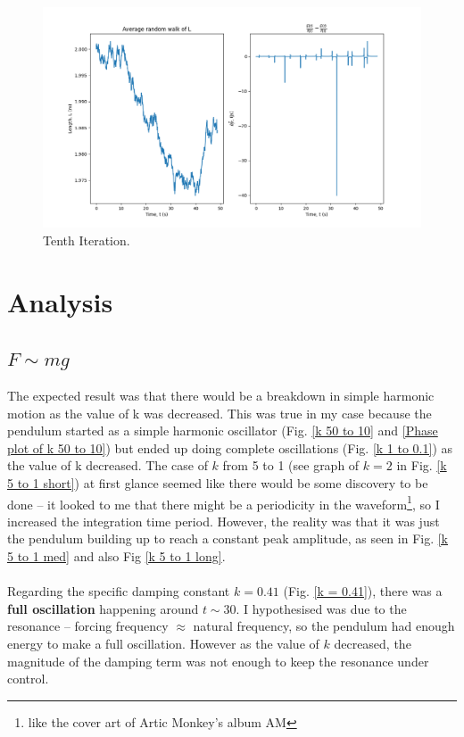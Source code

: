 \documentclass[10pt, twocolumn]{article}
\begin{document}
\begin{figure}
    \centering
    \includegraphics[width = \columnwidth]{Projects/ForcedSimplePendulum/Plots/simplified m = 1.0, L0= 2.0, k = 1000, g = 9.81, F = 20, sigma = 1e-10, run number 9.png}
    \caption{Tenth Iteration.}
    \label{fig:enter-label}
\end{figure}


\twocolumn
\section{Analysis}{\label{analysis}}
\subsection{$F \sim{mg}$}{\label{analysisFmg}}
The expected result was that there would be a breakdown in simple harmonic motion as the value of k was decreased. This was true in my case because the pendulum started as a simple harmonic oscillator (Fig. \ref{k 50 to 10} and \ref{Phase plot of k 50 to 10}) but ended up doing complete oscillations (Fig. \ref{k 1 to 0.1}) as the value of k decreased. The case of $k$ from 5 to 1 (see graph of $k = 2$ in Fig. \ref{k 5 to 1 short}) at first glance seemed like there would be some discovery to be done -- it looked to me that there might be a periodicity in the waveform\footnote{like the cover art of Artic Monkey's album AM}, so I increased the integration time period. However, the reality was that it was just the pendulum building up to reach a constant peak amplitude, as seen in Fig. \ref{k 5 to 1 med} and also Fig \ref{k 5 to 1 long}.\\
\\
Regarding the specific damping constant $k = 0.41$ (Fig. \ref{k = 0.41}), there was a \textbf{full oscillation} happening around $t \sim{30}$. I hypothesised was due to the resonance -- forcing frequency $\approx$ natural frequency, so the pendulum had enough energy to make a full oscillation. However as the value of $k$ decreased, the magnitude of the damping term was not enough to keep the resonance under control.
\end{document}
